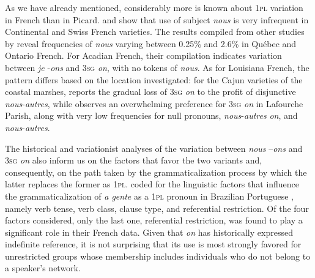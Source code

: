 \documentclass[output=paper,colorlinks,citecolor=brown]{langscibook}
\begin{document}
As we have already mentioned, considerably more is known about 1\textsc{pl} variation in French than in Picard. \citet{coveney_vestiges_2000} and \citet{fonseca-greber_subject_2003} show that use of subject \textit{nous} is very infrequent in Continental and Swiss French varieties. The results compiled from other studies by \citet[501]{king_interplay_2011} reveal frequencies of \textit{nous} varying between 0.25\% and 2.6\% in Québec and Ontario French. For Acadian French, their compilation indicates variation between \textit{je} -\textit{ons} and 3\textsc{sg} \textit{on}, with no tokens of \textit{nous}. As for Louisiana French, the pattern differs based on the location investigated: for the Cajun varieties of the coastal marshes, \citet[197]{rottet_language_2001} reports the gradual loss of 3\textsc{sg} \textit{on} to the profit of disjunctive \textit{nous}-\textit{autres}, while \citet[148]{dajko_ethnic_2009} observes an overwhelming preference for 3\textsc{sg} \textit{on} in Lafourche Parish, along with very low frequencies for null pronouns, \textit{nous}-\textit{autres} \textit{on}, and \textit{nous}-\textit{autres}.

The historical and variationist analyses of the variation between \textit{nous} –\textit{ons} and 3\textsc{sg} \textit{on} also inform us on the factors that favor the two variants and, consequently, on the path taken by the grammaticalization process by which the latter replaces the former as 1\textsc{pl}. \citet{king_interplay_2011} coded for the linguistic factors that influence the grammaticalization of \textit{a gente} as a 1\textsc{pl} pronoun in Brazilian Portuguese \citep{zilles_development_2005}, namely verb tense, verb class, clause type, and referential restriction. Of the four factors considered, only the last one, referential restriction, was found to play a significant role in their French data. Given that \textit{on} has historically expressed indefinite reference, it is not surprising that its use is most strongly favored for unrestricted groups whose membership includes individuals who do not belong to a speaker’s network.
\end{document}
